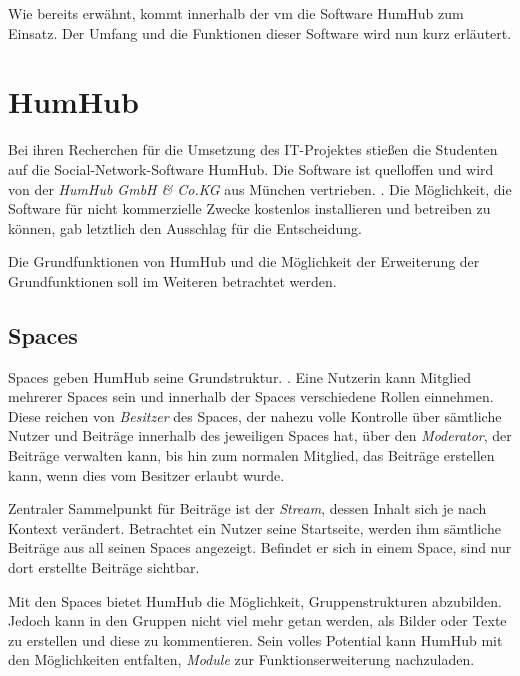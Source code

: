 Wie bereits erwähnt, kommt innerhalb der \ac{vm} die Software HumHub zum Einsatz. Der Umfang und die Funktionen dieser Software wird nun kurz erläutert.

\section{HumHub}

Bei ihren Recherchen für die Umsetzung des IT-Projektes stießen die Studenten auf die Social-Network-Software HumHub. Die Software ist quelloffen und wird von der \textit{HumHub GmbH \& Co.KG} aus München vertrieben. 
 \citep{humhubmain}.
Die Möglichkeit, die Software für nicht kommerzielle Zwecke kostenlos installieren und betreiben zu können, gab letztlich den Ausschlag für die Entscheidung.


Die Grundfunktionen von HumHub und die Möglichkeit der Erweiterung der Grundfunktionen soll im Weiteren betrachtet werden.

\subsection{Spaces}

Spaces geben HumHub seine Grundstruktur.  \citep{spaces}. 
Eine Nutzerin kann Mitglied mehrerer Spaces sein und innerhalb der Spaces verschiedene Rollen einnehmen. 
Diese reichen von \textit{Besitzer} des Spaces, der nahezu volle Kontrolle über sämtliche Nutzer und Beiträge innerhalb des jeweiligen Spaces hat, über den \textit{Moderator}, der Beiträge verwalten kann, bis hin zum normalen Mitglied, das Beiträge erstellen kann, wenn dies vom Besitzer erlaubt wurde.  

Zentraler Sammelpunkt für Beiträge ist der \textit{Stream}, dessen Inhalt sich je nach Kontext verändert. Betrachtet ein Nutzer seine Startseite, werden ihm sämtliche Beiträge aus all seinen Spaces angezeigt. 
Befindet er sich in einem Space, sind nur dort erstellte Beiträge sichtbar.

Mit den Spaces bietet HumHub die Möglichkeit, Gruppenstrukturen abzubilden. 
Jedoch kann in den Gruppen nicht viel mehr getan werden, als Bilder oder Texte zu erstellen und diese zu kommentieren.
Sein volles Potential kann HumHub mit den Möglichkeiten entfalten, \textit{Module} zur Funktionserweiterung nachzuladen.

